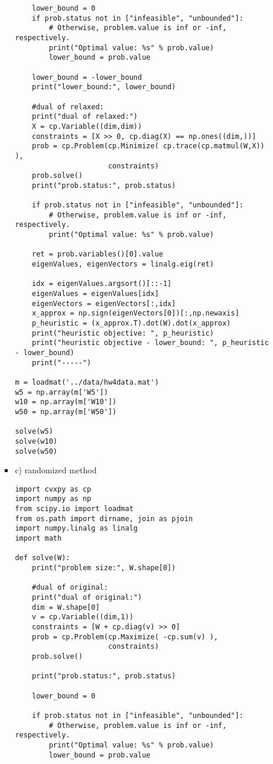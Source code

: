 \documentclass[12pt,letter]{article}
\begin{document}
\begin{enumerate}
\begin{enumerate}
\begin{itemize}
\begin{verbatim}
    lower_bound = 0
    if prob.status not in ["infeasible", "unbounded"]:
        # Otherwise, problem.value is inf or -inf, respectively.
        print("Optimal value: %s" % prob.value)
        lower_bound = prob.value

    lower_bound = -lower_bound
    print("lower_bound:", lower_bound)

    #dual of relaxed:
    print("dual of relaxed:")
    X = cp.Variable((dim,dim))
    constraints = [X >> 0, cp.diag(X) == np.ones((dim,))]
    prob = cp.Problem(cp.Minimize( cp.trace(cp.matmul(W,X)) ),
                      constraints)
    prob.solve()
    print("prob.status:", prob.status)
    
    if prob.status not in ["infeasible", "unbounded"]:
        # Otherwise, problem.value is inf or -inf, respectively.
        print("Optimal value: %s" % prob.value)

    ret = prob.variables()[0].value
    eigenValues, eigenVectors = linalg.eig(ret)

    idx = eigenValues.argsort()[::-1]
    eigenValues = eigenValues[idx]
    eigenVectors = eigenVectors[:,idx]
    x_approx = np.sign(eigenVectors[0])[:,np.newaxis]
    p_heuristic = (x_approx.T).dot(W).dot(x_approx)
    print("heuristic objective: ", p_heuristic)
    print("heuristic objective - lower_bound: ", p_heuristic - lower_bound)
    print("-----")
    
m = loadmat('../data/hw4data.mat')
w5 = np.array(m['W5'])
w10 = np.array(m['W10'])
w50 = np.array(m['W50'])

solve(w5)
solve(w10)
solve(w50)
\end{verbatim}
      \pagebreak
    \item c) randomized method
\begin{verbatim}
import cvxpy as cp
import numpy as np
from scipy.io import loadmat
from os.path import dirname, join as pjoin
import numpy.linalg as linalg
import math

def solve(W):
    print("problem size:", W.shape[0])
    
    #dual of original:
    print("dual of original:")
    dim = W.shape[0]
    v = cp.Variable((dim,1))
    constraints = [W + cp.diag(v) >> 0]
    prob = cp.Problem(cp.Maximize( -cp.sum(v) ),
                      constraints)
    prob.solve()

    print("prob.status:", prob.status)
    
    lower_bound = 0
    
    if prob.status not in ["infeasible", "unbounded"]:
        # Otherwise, problem.value is inf or -inf, respectively.
        print("Optimal value: %s" % prob.value)
        lower_bound = prob.value
        

\end{verbatim}
\end{itemize}
\end{enumerate}
\end{enumerate}
\end{document}

